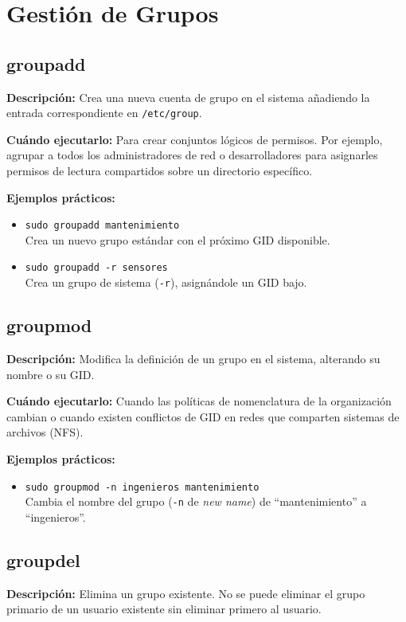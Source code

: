 \documentclass[11pt, a4paper]{article}
\begin{document}
\section{Gestión de Grupos}

\subsection{groupadd}
\textbf{Descripción:} Crea una nueva cuenta de grupo en el sistema añadiendo la entrada correspondiente en \texttt{/etc/group}.

\textbf{Cuándo ejecutarlo:} Para crear conjuntos lógicos de permisos. Por ejemplo, agrupar a todos los administradores de red o desarrolladores para asignarles permisos de lectura compartidos sobre un directorio específico.

\textbf{Ejemplos prácticos:}
\begin{itemize}
    \item \texttt{sudo groupadd mantenimiento} \\
    Crea un nuevo grupo estándar con el próximo GID disponible.
    \item \texttt{sudo groupadd -r sensores} \\
    Crea un grupo de sistema (\texttt{-r}), asignándole un GID bajo.
\end{itemize}

\subsection{groupmod}
\textbf{Descripción:} Modifica la definición de un grupo en el sistema, alterando su nombre o su GID.

\textbf{Cuándo ejecutarlo:} Cuando las políticas de nomenclatura de la organización cambian o cuando existen conflictos de GID en redes que comparten sistemas de archivos (NFS).

\textbf{Ejemplos prácticos:}
\begin{itemize}
    \item \texttt{sudo groupmod -n ingenieros mantenimiento} \\
    Cambia el nombre del grupo (\texttt{-n} de \textit{new name}) de ``mantenimiento'' a ``ingenieros''.
\end{itemize}

\subsection{groupdel}
\textbf{Descripción:} Elimina un grupo existente. No se puede eliminar el grupo primario de un usuario existente sin eliminar primero al usuario.
\end{document}
